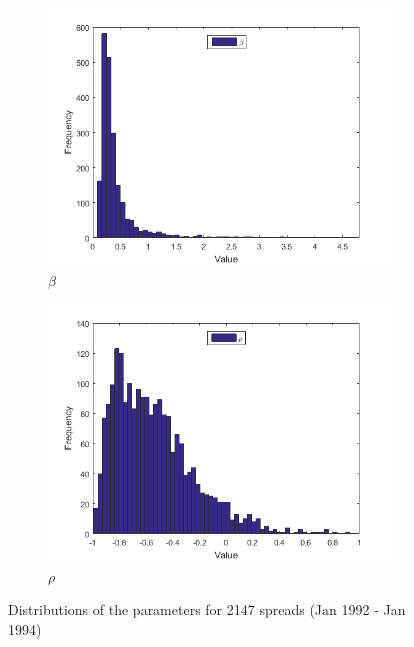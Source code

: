 \documentclass[11pt,a4,twosided,singlespacing,titlepagenumber=on]{scrreprt}
\numberwithin{equation}{chapter} %
\theoremstyle{remark}
\begin{document}
\begin{figure}[H]
\begin{subfigure}[t]{0.32\textwidth}
        \includegraphics[width=1\textwidth]{res/params/731_1462/5}
        \caption{$\beta$}
    \end{subfigure}
    \begin{subfigure}[t]{0.32\textwidth}
        \centering
        \includegraphics[width=1\textwidth]{res/params/731_1462/6}
        \caption{$\rho$}
    \end{subfigure}
    \caption{Distributions of the parameters for 2147 spreads (Jan 1992 - Jan 1994)}
    \label{fig:param_dists_1992_1994}
\end{figure}
\end{document}
